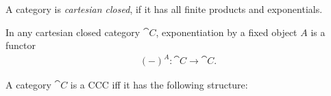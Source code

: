 \documentclass{article}
\begin{document}
\begin{definition}[Awodey p. 122]
    A category is \emph{cartesian closed}, if it has all finite
    products and exponentials.
\end{definition}

\begin{proposition}[Awodey p. 126]
    In any cartesian closed category $\cat C$, exponentiation by a
    fixed object $A$ is a functor
    \begin{align*}
        (-)^A:\cat C\to\cat C.
    \end{align*}
\end{proposition}

\begin{proposition}[Awodey p. 134]
    A category $\cat C$ is a CCC iff it has the following structure:


\end{proposition}
\end{document}
